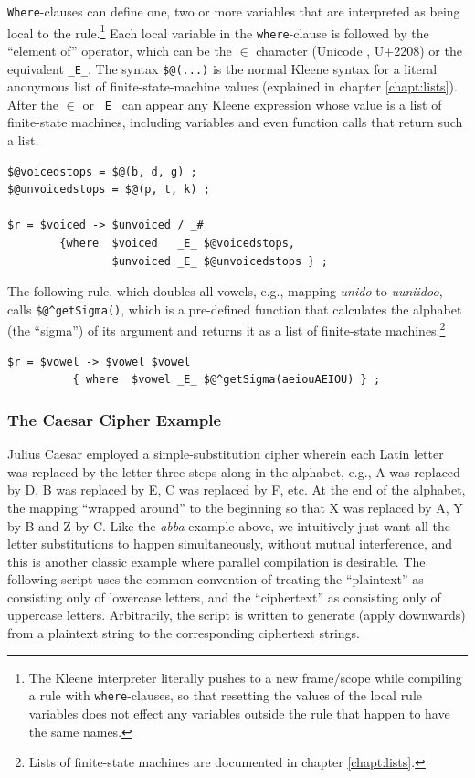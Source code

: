 \texttt{Where}-clauses can define one, two or more variables that are interpreted as being
local to the rule.\footnote{The Kleene interpreter literally pushes to a new
	frame/scope while compiling a rule with \texttt{where}-clauses, so that resetting the
values of the local rule variables does not effect any variables outside the rule
that happen to have the same names.}  Each local variable in the \texttt{where}-clause is
followed by the ``element of'' operator, which can be the $\in$ character
(Unicode , U+2208) or the  equivalent \verb!_E_!.  The
syntax \verb!$@(...)! is the normal Kleene syntax for a literal anonymous list of
finite-state-machine values (explained in chapter \ref{chapt:lists}).  After the $\in$ or \verb!_E_! can appear any Kleene
expression whose value is a list of finite-state machines, including variables
and even function calls that return such a list.

\begin{samepage}
\begin{Verbatim}
$@voicedstops = $@(b, d, g) ;
$@unvoicedstops = $@(p, t, k) ;

$r = $voiced -> $unvoiced / _#  
        {where  $voiced   _E_ $@voicedstops, 
                $unvoiced _E_ $@unvoicedstops } ;
\end{Verbatim}
\end{samepage}

\noindent
The following rule, which doubles all vowels, e.g., mapping \emph{unido} to
\emph{uuniidoo}, calls \verb!$@^getSigma()!, which is a pre-defined function that
calculates the alphabet (the ``sigma'') of its \fsm{}
argument and returns it as a list of finite-state
machines.\footnote{Lists of finite-state machines are documented in
chapter \ref{chapt:lists}.}

\begin{Verbatim}
$r = $vowel -> $vowel $vowel 
          { where  $vowel _E_ $@^getSigma(aeiouAEIOU) } ;
\end{Verbatim}

\subsubsection{The Caesar Cipher Example}

Julius Caesar employed a simple-substitution cipher wherein each Latin
letter was replaced by the letter three steps along
in the alphabet, e.g., A was replaced by D, B was replaced by E, C was replaced by F, etc.  At the end of the alphabet,
the mapping ``wrapped around'' to the beginning so that X was replaced
by A, Y by B and Z by C.  Like the \emph{abba} example
above, we intuitively just want all the letter substitutions to happen simultaneously, without mutual interference, and
this is another classic example where parallel compilation is desirable.  The following script uses the common convention
of treating the ``plaintext'' as consisting only of lowercase letters, and the ``ciphertext'' as consisting only of uppercase
letters.  Arbitrarily, the script is written to generate (apply downwards) from a plaintext string to the
corresponding ciphertext strings.


